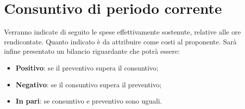%


\section{Consuntivo di periodo corrente} %
\label{sec:consuntivo}
Verranno indicate di seguito le spese effettivamente sostenute, relative alle ore rendicontate. Quanto indicato è da attribuire come costi al proponente. \newline
Sarà infine presentato un bilancio riguardante che potrà essere:
	\begin{itemize}
		\item \textbf{Positivo}: se il preventivo supera il consuntivo;
		\item \textbf{Negativo}: se il consuntivo supera il preventivo;
		\item \textbf{In pari}: se consuntivo e preventivo sono uguali.
	\end{itemize}




